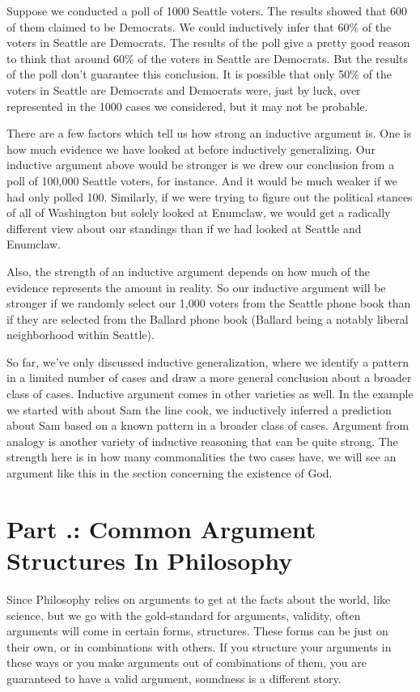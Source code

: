     Suppose we conducted a poll of 1000 Seattle voters. The results showed that 600 of them claimed to be Democrats. We could inductively infer that 60\% of the voters in Seattle are Democrats. The results of the poll give a pretty good reason to think that around 60\% of the voters in Seattle are Democrats. But the results of the poll don’t guarantee this conclusion. It is possible that only 50\% of the voters in Seattle are Democrats and Democrats were, just by luck, over represented in the 1000 cases we considered, but it may not be probable.

There are a few factors which tell us how strong an inductive argument is. One is how much evidence we have looked at before inductively generalizing. Our inductive argument above would be stronger is we drew our conclusion from a poll of 100,000 Seattle voters, for instance. And it would be much weaker if we had only polled 100. Similarly, if we were trying to figure out the political stances of all of Washington but solely looked at Enumclaw, we would get a radically different view about our standings than if we had looked at Seattle and Enumclaw.

Also, the strength of an inductive argument depends on how much of the evidence represents the amount in reality. So our inductive argument will be stronger if we randomly select our 1,000 voters from the Seattle phone book than if they are selected from the Ballard phone book (Ballard being a notably liberal neighborhood within Seattle).

So far, we’ve only discussed inductive generalization, where we identify a pattern in a limited number of cases and draw a more general conclusion about a broader class of cases. Inductive argument comes in other varieties as well. In the example we started with about Sam the line cook, we inductively inferred a prediction about Sam based on a known pattern in a broader class of cases. Argument from analogy is another variety of inductive reasoning that can be quite strong. The strength here is in how many commonalities the two cases have, we will see an argument like this in the section concerning the existence of God.

\section{Part \thechapcount.\theseccount: Common Argument Structures In Philosophy}
\label{s:p1.3}

Since Philosophy relies on arguments to get at the facts about the world, like science, but we go with the gold-standard for arguments, validity, often arguments will come in certain forms, structures. These forms can be just on their own, or in combinations with others. If you structure your arguments in these ways or you make arguments out of combinations of them, you are guaranteed to have a valid argument, soundness is a different story. 

